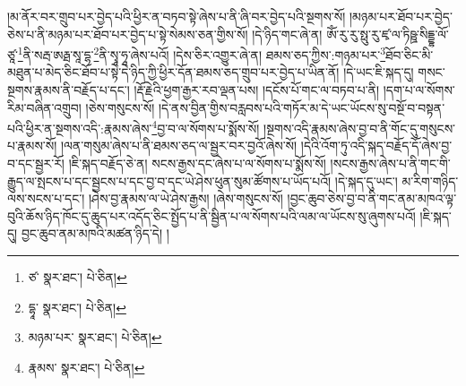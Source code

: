 །མ་ནོར་བར་གྲུབ་པར་བྱེད་པའི་ཕྱིར་ན་བཏབ་སྟེ་ཞེས་པ་ནི་ཞི་བར་བྱེད་པའི་སྔགས་སོ། །མཉམ་པར་ཐོབ་པར་བྱེད་ཅེས་པ་ནི་མཉམ་པར་ཐོབ་པར་བྱེད་པ་སྟེ་སེམས་ཅན་གྱིས་སོ། །དེ་ཉིད་གང་ཞེ་ན། ཨོཾ་རུ་རུ་སྥུ་རུ་ཛྭ་ལ་ཏིཥྛ་སིདྡྷ་ལོ་ཙཱ་\footnote{ཙ་  སྣར་ཐང་།  པེ་ཅིན། }ནི་སརྦ་ཨརྠ་སཱ་དྷ་\footnote{དྷཱ་  སྣར་ཐང་།  པེ་ཅིན། }ནི་སྭཱ་ཧཱ་ཞེས་པའོ། །དེས་ཅིར་འགྱུར་ཞེ་ན། ཐམས་ཅད་ཀྱིས་:གཉམ་པར་\footnote{མཉམ་པར་  སྣར་ཐང་།  པེ་ཅིན། }ཐོབ་ཅིང་མི་མཐུན་པ་མེད་ཅིང་ཐོབ་པ་སྟེ་དེ་ཉིད་ཀྱི་ཕྱིར་དོན་ཐམས་ཅད་གྲུབ་པར་བྱེད་པ་ཡིན་ནོ། །དེ་ཡང་ཇི་སྐད་དུ། གསང་སྔགས་རྣམས་ནི་བརྗོད་པ་དང་། །རྡོ་རྗེའི་ཕྱག་རྒྱར་རབ་ལྡན་པས། །དངོས་པོ་གང་ལ་བཏབ་པ་ནི། །དག་པ་ལ་སོགས་རིམ་བཞིན་འགྲུབ། །ཅེས་གསུངས་སོ། །དེ་ནས་བྱིན་གྱིས་བརླབས་པའི་གཏོར་མ་དེ་ཡང་ཡོངས་སུ་བསྔོ་བ་བསྟན་པའི་ཕྱིར་ན་སྔགས་འདི་:རྣམས་ཞེས་\footnote{རྣམས་  སྣར་ཐང་།  པེ་ཅིན། }བྱ་བ་ལ་སོགས་པ་སྨོས་སོ། །སྔགས་འདི་རྣམས་ཞེས་བྱ་བ་ནི་གོང་དུ་གསུངས་པ་རྣམས་སོ། །ལན་གསུམ་ཞེས་པ་ནི་ཐམས་ཅད་ལ་སྦྱར་བར་བྱའོ་ཞེས་སོ། །དེའི་འོག་ཏུ་འདི་སྐད་བརྗོད་དོ་ཞེས་བྱ་བ་དང་སྦྱར་རོ། །ཇི་སྐད་བརྗོད་ཅེ་ན། སངས་རྒྱས་དང་ཞེས་པ་ལ་སོགས་པ་སྨོས་སོ། །སངས་རྒྱས་ཞེས་པ་ནི་གང་གི་རྒྱུད་ལ་སྤངས་པ་དང་སྦྱངས་པ་དང་བྱ་བ་དང་ཡེ་ཤེས་ཕུན་སུམ་ཚོགས་པ་ཡོད་པའོ། །དེ་སྐད་དུ་ཡང་། མ་རིག་གཉིད་ལས་སངས་པ་དང་། །ཤེས་བྱ་རྣམས་ལ་ཡེ་ཤེས་རྒྱས། །ཞེས་གསུངས་སོ། །བྱང་ཆུབ་ཅེས་བྱ་བ་ནི་གང་ནམ་མཁའ་ལྟ་བུའི་ཆོས་ཉིད་ཁོང་དུ་ཆུད་པར་འདོད་ཅིང་སྤྱོད་པ་ནི་སྦྱིན་པ་ལ་སོགས་པའི་ལམ་ལ་ཡོངས་སུ་ཞུགས་པའོ། །ཇི་སྐད་དུ། བྱང་ཆུབ་ནམ་མཁའི་མཚན་ཉིད་དེ། །
